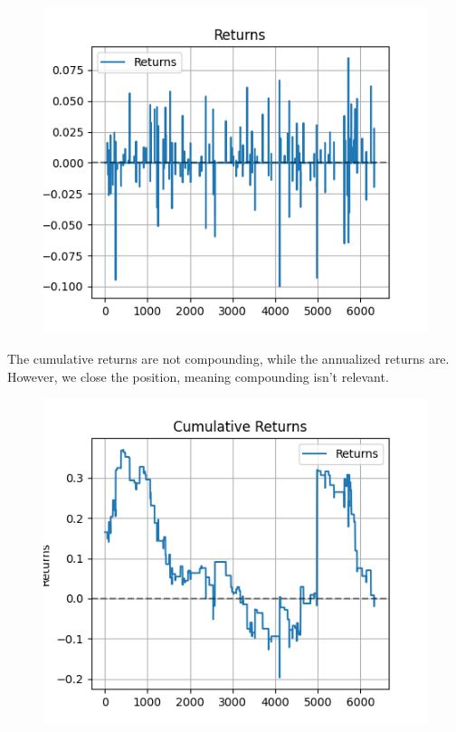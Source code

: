 \documentclass[a4paper]{article}
\begin{document}
\begin{figure}[H]
    \begin{center}
        \includegraphics{../generated/returns.png}
    \end{center}
\end{figure}

The cumulative returns are not compounding, while the annualized returns are.
However, we close the position, meaning compounding isn't relevant.

\begin{figure}[H]
    \begin{center}
        \includegraphics{../generated/cumulative_returns.png}
    \end{center}
\end{figure}
\end{document}
